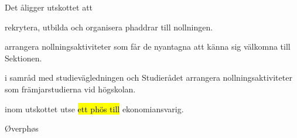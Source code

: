 \documentclass[../_main/handlingar.tex]{subfiles}
\begin{document}
\begin{attsatser}
\begin{emptylist}
        \item Det åligger utskottet att

        \begin{dashlist}
            \item rekrytera, utbilda och organisera phaddrar till nollningen.
            \item arrangera nollningsaktiviteter som får de nyantagna att känna sig välkomna till Sektionen.
            \item i samråd med studievägledningen och Studierådet arrangera nollningsaktiviteter som främjarstudierna vid högskolan.
            \item inom utskottet utse \hl{ett phös till} ekonomiansvarig.
        \end{dashlist}
        \changenote
    \end{emptylist}

\end{attsatser}

\begin{signatures}{1}
    \ist
    \signature{\oph}{Øverphøs}
\end{signatures}
\end{document}
